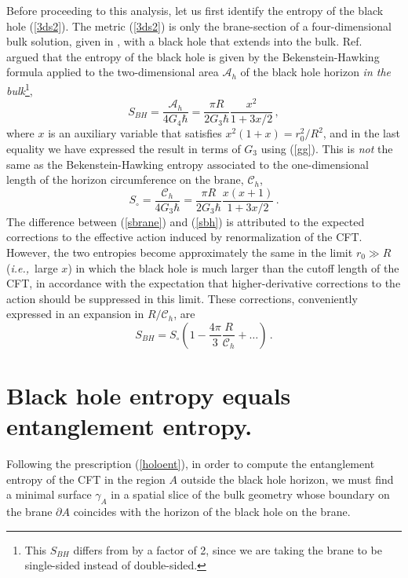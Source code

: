 \documentclass[12pt]{article}
\newcommand{\beq}{\begin{equation}}
\newcommand{\eeq}{\end{equation}}
\newcommand{\ie}{{\it i.e.,}\ }
\newcommand{\reef}[1]{(\ref{#1})}
\begin{document}
Before proceeding to this analysis, let us first identify the entropy of
the black hole \reef{3ds2}. The metric \reef{3ds2} is only the
brane-section of a four-dimensional bulk solution, given in \cite{ehm1},
with a black hole that extends into the bulk. Ref.~\cite{ehm1} argued
that the entropy of the black hole is given by the Bekenstein-Hawking
formula applied to the two-dimensional area $\mathcal{A}_{h}$ of the
black hole horizon {\em in the bulk}\footnote{This $S_{BH}$ differs from
\cite{ehm1} by a factor of 2, since we are taking the brane to be
single-sided instead of double-sided.},
\beq\label{sbrane}
S_{BH}=\frac{\mathcal{A}_{h}}{4G_{4}\hbar} 
=\frac{\pi R}{2G_3\hbar}\frac{x^2}{1+3x/2}\,,
\eeq
where $x$ is an auxiliary variable that satisfies $x^2(1+x)=r_0^2/R^2$,
and in the last equality we have expressed the result in terms of $G_3$
using \reef{gg}.
This is \textit{not} the same as the Bekenstein-Hawking entropy
associated to the one-dimensional length of the horizon circumference on
the brane,
$\mathcal{C}_{h}$,
\beq\label{sbh}
S_{\circ}=\frac{\mathcal{C}_{h}}{4G_3\hbar} 
= \frac{\pi R}{2G_3\hbar}\frac{x(x+1)}{1+3x/2}\,.
\eeq
The difference between \reef{sbrane} and \reef{sbh} is attributed to the
expected corrections to the effective action induced by renormalization
of the CFT. However, the two entropies become approximately the same in
the limit $r_0\gg R$ (\ie large $x$) in which the black hole is much
larger than the cutoff length of the CFT, in accordance with the
expectation that higher-derivative corrections to the action should be
suppressed in this limit. These corrections, conveniently expressed in
an expansion in $R/\mathcal{C}_{h}$, are
\beq\label{sbhso}
S_{BH}=S_{\circ}\left(1-\frac{4\pi}{3}\frac{R}{\mathcal{C}_{h}}
+\dots
\right)\,.
\eeq



\section{Black hole entropy equals entanglement entropy.}
Following the prescription \reef{holoent}, in order to compute the
entanglement entropy of the CFT in the region $A$ outside the black hole
horizon, we must find a minimal surface $\gamma_A$ in a spatial slice of
the bulk geometry whose boundary on the brane $\partial A$ coincides
with the horizon of the black hole on the brane. 
\end{document}

